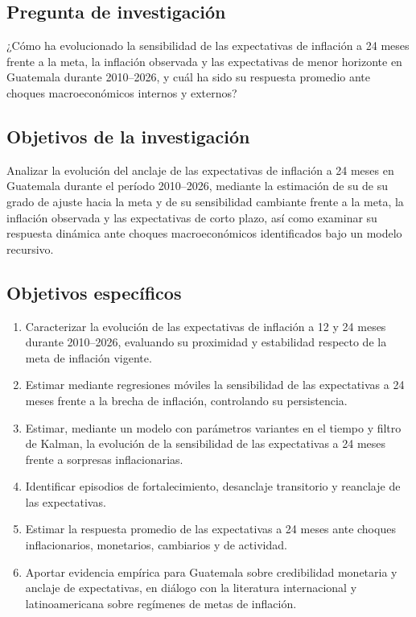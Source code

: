 \documentclass[
  10.5pt,
  letterpaper,
  twocolumn]{article}
\providecommand{\tightlist}{%
  \setlength{\itemsep}{0pt}\setlength{\parskip}{0pt}}
\begin{document}
\subsection{Pregunta de
investigación}\label{pregunta-de-investigaciuxf3n}

¿Cómo ha evolucionado la sensibilidad de las expectativas de inflación a
24 meses frente a la meta, la inflación observada y las expectativas de
menor horizonte en Guatemala durante 2010--2026, y cuál ha sido su
respuesta promedio ante choques macroeconómicos internos y externos?

\subsection{Objetivos de la
investigación}\label{objetivos-de-la-investigaciuxf3n}

Analizar la evolución del anclaje de las expectativas de inflación a 24
meses en Guatemala durante el período 2010--2026, mediante la estimación
de su de su grado de ajuste hacia la meta y de su sensibilidad cambiante
frente a la meta, la inflación observada y las expectativas de corto
plazo, así como examinar su respuesta dinámica ante choques
macroeconómicos identificados bajo un modelo recursivo.

\subsection{Objetivos específicos}\label{objetivos-especuxedficos}

\begin{enumerate}
\def\labelenumi{\arabic{enumi}.}
\tightlist
\item
  Caracterizar la evolución de las expectativas de inflación a 12 y 24
  meses durante 2010--2026, evaluando su proximidad y estabilidad
  respecto de la meta de inflación vigente.
\item
  Estimar mediante regresiones móviles la sensibilidad de las
  expectativas a 24 meses frente a la brecha de inflación, controlando
  su persistencia.
\item
  Estimar, mediante un modelo con parámetros variantes en el tiempo y
  filtro de Kalman, la evolución de la sensibilidad de las expectativas
  a 24 meses frente a sorpresas inflacionarias.
\item
  Identificar episodios de fortalecimiento, desanclaje transitorio y
  reanclaje de las expectativas.
\item
  Estimar la respuesta promedio de las expectativas a 24 meses ante
  choques inflacionarios, monetarios, cambiarios y de actividad.
\item
  Aportar evidencia empírica para Guatemala sobre credibilidad monetaria
  y anclaje de expectativas, en diálogo con la literatura internacional
  y latinoamericana sobre regímenes de metas de inflación.
\end{enumerate}
\end{document}
